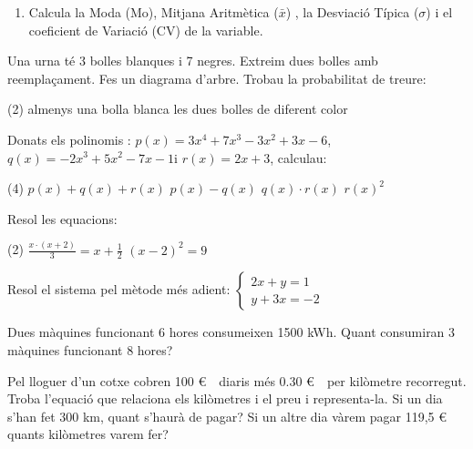 \begin{mylist}
\begin{enumerate}
\item Calcula la Moda (Mo),  Mitjana Aritmètica ($\bar x$) ,  la Desviació Típica ($\sigma$)  i el  coeficient de Variació (CV)  de la variable.
		\end{enumerate}
	
	 
	
	\exer[2] Una urna té 3 bolles blanques i 7 negres. Extreim dues bolles amb reemplaçament. Fes un diagrama d'arbre. Trobau la probabilitat de treure:
	\begin{tasks}(2)
		\task almenys una bolla blanca
		\task les dues bolles de diferent color
	\end{tasks} 
 
	\exer[2] Donats els polinomis : $p(x)=3x^4+7x^3-3x^2+3x-6$, $q(x)=-2x^3+5x^2-7x-1$i $r(x)=2x+3$, calculau:
	\begin{tasks}(4)
		\task $p(x)+q(x)+r(x)$
		\task $p(x)-q(x)$
		\task $q(x)\cdot r(x)$
		\task $r(x)^2$
	\end{tasks}
	 
	 \exer[2] Resol les equacions:
	\begin{tasks}(2)
		\task $\frac{x\cdot (x+2)}{3}=x+\frac{1}{2}$  
		\task ${(x-2)}^2=9$
	\end{tasks} 
	
	\exer[2] Resol el sistema pel mètode més adient: $\left \{ \begin{array}{c}
	2x+y=1 \\ 
	y+3x=-2 \end{array}
	\right.$ 
	
	\exer[2] Dues màquines funcionant 6 hores consumeixen 1500 kWh. Quant consumiran 3 màquines funcionant 8 hores?
	
	\exer[2] Pel lloguer d'un cotxe cobren 100 \euro\ \ diaris més 0.30 \euro\ \ per kilòmetre recorregut. Troba l'equació que relaciona els kilòmetres i el preu i representa-la. Si un dia s'han fet 300 km, quant s'haurà de pagar? Si un altre dia vàrem pagar 119,5 \euro\ \, quants kilòmetres varem fer?
	
	 
	

\end{mylist}
